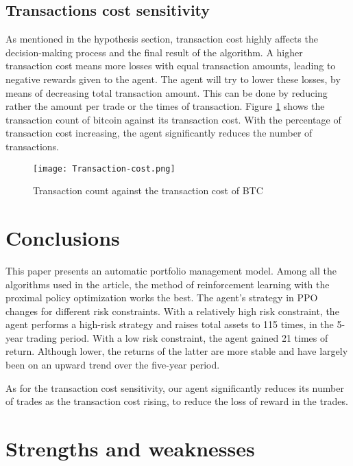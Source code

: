 \documentclass{mcmthesis}
\begin{document}
\subsection{Transactions cost sensitivity}

As mentioned in the hypothesis section, transaction cost highly affects the decision-making process and the final result of the algorithm.
A higher transaction cost means more losses with equal transaction amounts,
leading to negative rewards given to the agent.
The agent will try to lower these losses, by means of decreasing total transaction amount.
This can be done by reducing rather the amount per trade or the times of transaction.
Figure \ref{Transaction-cost} shows the transaction count of bitcoin against its transaction cost.
With the percentage of transaction cost increasing, the agent significantly reduces the number of transactions.

\begin{figure}[h]
  \small
  \centering
  \texttt{[image: Transaction-cost.png]}
  \caption{Transaction count against the transaction cost of BTC}
  \label{Transaction-cost}
\end{figure}

\section{Conclusions}

This paper presents an automatic portfolio management model.
Among all the algorithms used in the article, the method of reinforcement learning with the proximal policy optimization works the best.
The agent's strategy in PPO changes for different risk constraints.
With a relatively high risk constraint, the agent performs a high-risk strategy and raises total assets to 115 times, in the 5-year trading period.
With a low risk constraint, the agent gained 21 times of return. Although lower, the returns of the latter are more stable and have largely been on an upward trend over the five-year period.

As for the transaction cost sensitivity, our agent significantly reduces its number of trades as the transaction cost rising, to reduce the loss of reward in the trades.

\section{Strengths and weaknesses}
\end{document}
